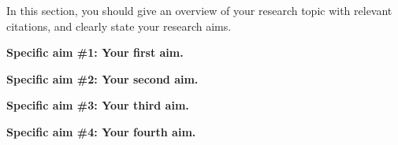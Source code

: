 
In this section, you should give an overview of your research topic with relevant citations, and clearly state your research aims.

\vspace{5mm} %

\textbf{Specific aim \#1: Your first aim.} \lipsum[1-2]

\textbf{Specific aim \#2: Your second aim.} \lipsum[1-2]

\textbf{Specific aim \#3: Your third aim.} \lipsum[1-2]

\textbf{Specific aim \#4: Your fourth aim.} \lipsum[1-2]

